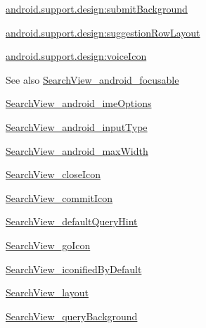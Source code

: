 {\ttfamily \hyperlink{classandroid_1_1support_1_1design_1_1R_1_1styleable_accdf4bff313010f9ca3ee8384626b8cb}{android.\+support.\+design\+:submit\+Background}}

{\ttfamily \hyperlink{classandroid_1_1support_1_1design_1_1R_1_1styleable_aa9bcaf27bf978930d50357c99f8abada}{android.\+support.\+design\+:suggestion\+Row\+Layout}}

{\ttfamily \hyperlink{classandroid_1_1support_1_1design_1_1R_1_1styleable_ab8427471179b0f69c665ef59d850bd39}{android.\+support.\+design\+:voice\+Icon}}

\begin{DoxySeeAlso}{See also}
\hyperlink{classandroid_1_1support_1_1design_1_1R_1_1styleable_a7ac28ac6ee547e469ab02402f744e213}{Search\+View\+\_\+android\+\_\+focusable} 

\hyperlink{classandroid_1_1support_1_1design_1_1R_1_1styleable_af9de3573ac6e0e2c6743858a629db9e5}{Search\+View\+\_\+android\+\_\+ime\+Options} 

\hyperlink{classandroid_1_1support_1_1design_1_1R_1_1styleable_ade6584fc0075b1b9f4eb7d962b817198}{Search\+View\+\_\+android\+\_\+input\+Type} 

\hyperlink{classandroid_1_1support_1_1design_1_1R_1_1styleable_ab62fc7eb5b7b2bc25ef503ebe25dc42b}{Search\+View\+\_\+android\+\_\+max\+Width} 

\hyperlink{classandroid_1_1support_1_1design_1_1R_1_1styleable_aa0a9fd15edd08df1deca5a77072d1fb5}{Search\+View\+\_\+close\+Icon} 

\hyperlink{classandroid_1_1support_1_1design_1_1R_1_1styleable_a9fa9a7e88b9b47cd40415ede8e02019d}{Search\+View\+\_\+commit\+Icon} 

\hyperlink{classandroid_1_1support_1_1design_1_1R_1_1styleable_a169926ffb29c292c78de7f9770a418e6}{Search\+View\+\_\+default\+Query\+Hint} 

\hyperlink{classandroid_1_1support_1_1design_1_1R_1_1styleable_a1ce6776217e2c2e3d29ecc0a70889b21}{Search\+View\+\_\+go\+Icon} 

\hyperlink{classandroid_1_1support_1_1design_1_1R_1_1styleable_a885ff4567a9e9b0a2f61d08d2b7e4a7d}{Search\+View\+\_\+iconified\+By\+Default} 

\hyperlink{classandroid_1_1support_1_1design_1_1R_1_1styleable_a508458355c8e4fb9a6661d806c0ec352}{Search\+View\+\_\+layout} 

\hyperlink{classandroid_1_1support_1_1design_1_1R_1_1styleable_a625f77d9f60563036744e0de3279d85b}{Search\+View\+\_\+query\+Background} 


\end{DoxySeeAlso}

